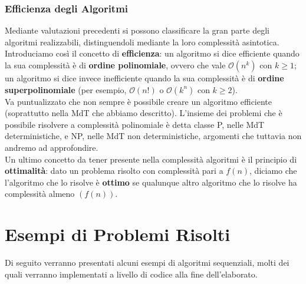 \subsection{Efficienza degli Algoritmi}
Mediante valutazioni precedenti si possono classificare la gran parte degli algoritmi realizzabili, distinguendoli mediante la loro complessità asintotica. Introduciamo così il concetto di \textbf{efficienza}: un algoritmo si dice efficiente quando la sua complessità è di \textbf{ordine polinomiale}, ovvero che vale $\mathcal{O}(n^k)$ con $k \geq 1$; un algoritmo si dice invece inefficiente quando la sua complessità è di \textbf{ordine superpolinomiale} (per esempio, $\mathcal{O}(n!)$ o $\mathcal{O}(k^n)$ con $k \geq 2$).\\
Va puntualizzato che non sempre è possibile creare un algoritmo efficiente (soprattutto nella MdT che abbiamo descritto). L'insieme dei problemi che è possibile risolvere a complessità polinomiale è detta classe P, nelle MdT deterministiche, e NP, nelle MdT non deterministiche, argomenti che tuttavia non andremo ad approfondire.\\
Un ultimo concetto da tener presente nella complessità algoritmi è il principio di \textbf{ottimalità}: dato un problema risolto con complessità pari a $f(n)$, diciamo che l'algoritmo che lo risolve è \textbf{ottimo} se qualunque altro algoritmo che lo risolve ha complessità almeno $(f(n))$.
\chapter{Esempi di Problemi Risolti}
Di seguito verranno presentati alcuni esempi di algoritmi sequenziali, molti dei quali verranno implementati a livello di codice alla fine dell'elaborato.

